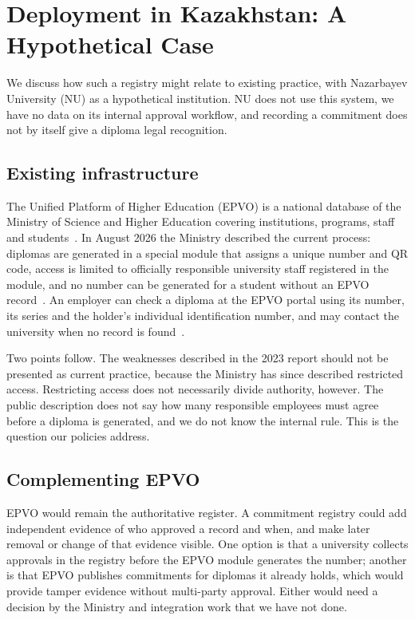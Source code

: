 \section{Deployment in Kazakhstan: A Hypothetical Case}\label{sec:kz}
We discuss how such a registry might relate to existing practice, with Nazarbayev University (NU) as a hypothetical institution. NU does not use this system, we have no data on its internal approval workflow, and recording a commitment does not by itself give a diploma legal recognition.

\subsection{Existing infrastructure}
The Unified Platform of Higher Education (EPVO) is a national database of the Ministry of Science and Higher Education covering institutions, programs, staff and students~\cite{epvo}. In August 2026 the Ministry described the current process: diplomas are generated in a special module that assigns a unique number and QR code, access is limited to officially responsible university staff registered in the module, and no number can be generated for a student without an EPVO record~\cite{kznews2026}. An employer can check a diploma at the EPVO portal using its number, its series and the holder's individual identification number, and may contact the university when no record is found~\cite{kzfaq}.

Two points follow. The weaknesses described in the 2023 report should not be presented as current practice, because the Ministry has since described restricted access. Restricting access does not necessarily divide authority, however. The public description does not say how many responsible employees must agree before a diploma is generated, and we do not know the internal rule. This is the question our policies address.

\subsection{Complementing EPVO}
EPVO would remain the authoritative register. A commitment registry could add independent evidence of who approved a record and when, and make later removal or change of that evidence visible. One option is that a university collects approvals in the registry before the EPVO module generates the number; another is that EPVO publishes commitments for diplomas it already holds, which would provide tamper evidence without multi-party approval. Either would need a decision by the Ministry and integration work that we have not done.

